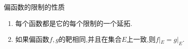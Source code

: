 \begin{proposition}{偏函数的限制的性质}{}
	\begin{enumerate}
		\item 每个函数都是它的每个限制的一个延拓.
		\item 如果偏函数$f,g$的靶相同,并且在集合$E$上一致,则$f|_{E}=g|_{E}$.
	\end{enumerate}
\end{proposition}













































































